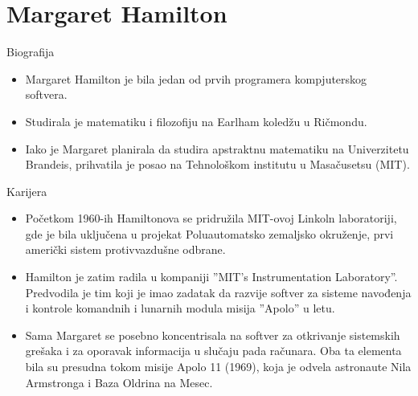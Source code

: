 \documentclass[aspectratio=169]{beamer}
\begin{document}
\section{Margaret Hamilton}
\begin{frame}{Biografija}

    \begin{itemize}
        \item<1-> Margaret Hamilton je bila jedan od prvih programera kompjuterskog softvera.
        
        \item<2-> Studirala je matematiku i filozofiju na Earlham koledžu u Ričmondu.
        
        \item<3->Iako je Margaret planirala da studira apstraktnu matematiku na Univerzitetu Brandeis, prihvatila je posao na Tehnološkom institutu u Masačusetsu (MIT).
    \end{itemize}


\end{frame}
\begin{frame}{Karijera}

    \begin{itemize}
        \item<1-> Početkom 1960-ih Hamiltonova se pridružila MIT-ovoj Linkoln laboratoriji, gde je bila uključena u projekat Poluautomatsko zemaljsko okruženje, prvi američki sistem protivvazdušne odbrane.
        
        \item<2->Hamilton je zatim radila u kompaniji ''MIT’s Instrumentation Laboratory''. Predvodila je tim koji je imao zadatak da razvije softver za sisteme navođenja i kontrole komandnih i lunarnih modula misija ''Apolo'' u letu.
        
        \item<3-> Sama Margaret se posebno koncentrisala na softver za otkrivanje sistemskih grešaka i za oporavak informacija u slučaju pada računara. Oba ta elementa bila su presudna tokom misije Apolo 11 (1969), koja je odvela astronaute Nila Armstronga i Baza Oldrina na Mesec.
    \end{itemize}


\end{frame}
\end{document}
